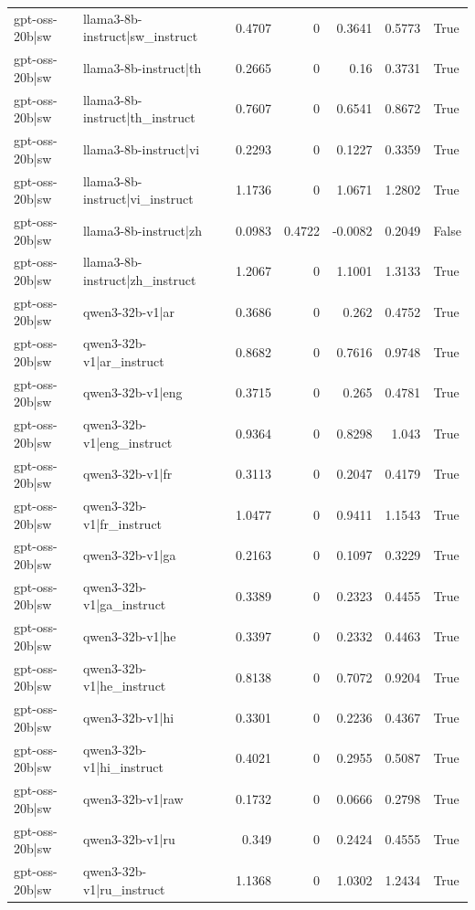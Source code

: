 \begin{table}
\begin{tabular}{l l r r r r l}
gpt-oss-20b|sw & llama3-8b-instruct|sw_instruct & 0.4707 & 0 & 0.3641 & 0.5773 & True \\
gpt-oss-20b|sw & llama3-8b-instruct|th & 0.2665 & 0 & 0.16 & 0.3731 & True \\
gpt-oss-20b|sw & llama3-8b-instruct|th_instruct & 0.7607 & 0 & 0.6541 & 0.8672 & True \\
gpt-oss-20b|sw & llama3-8b-instruct|vi & 0.2293 & 0 & 0.1227 & 0.3359 & True \\
gpt-oss-20b|sw & llama3-8b-instruct|vi_instruct & 1.1736 & 0 & 1.0671 & 1.2802 & True \\
gpt-oss-20b|sw & llama3-8b-instruct|zh & 0.0983 & 0.4722 & -0.0082 & 0.2049 & False \\
gpt-oss-20b|sw & llama3-8b-instruct|zh_instruct & 1.2067 & 0 & 1.1001 & 1.3133 & True \\
gpt-oss-20b|sw & qwen3-32b-v1|ar & 0.3686 & 0 & 0.262 & 0.4752 & True \\
gpt-oss-20b|sw & qwen3-32b-v1|ar_instruct & 0.8682 & 0 & 0.7616 & 0.9748 & True \\
gpt-oss-20b|sw & qwen3-32b-v1|eng & 0.3715 & 0 & 0.265 & 0.4781 & True \\
gpt-oss-20b|sw & qwen3-32b-v1|eng_instruct & 0.9364 & 0 & 0.8298 & 1.043 & True \\
gpt-oss-20b|sw & qwen3-32b-v1|fr & 0.3113 & 0 & 0.2047 & 0.4179 & True \\
gpt-oss-20b|sw & qwen3-32b-v1|fr_instruct & 1.0477 & 0 & 0.9411 & 1.1543 & True \\
gpt-oss-20b|sw & qwen3-32b-v1|ga & 0.2163 & 0 & 0.1097 & 0.3229 & True \\
gpt-oss-20b|sw & qwen3-32b-v1|ga_instruct & 0.3389 & 0 & 0.2323 & 0.4455 & True \\
gpt-oss-20b|sw & qwen3-32b-v1|he & 0.3397 & 0 & 0.2332 & 0.4463 & True \\
gpt-oss-20b|sw & qwen3-32b-v1|he_instruct & 0.8138 & 0 & 0.7072 & 0.9204 & True \\
gpt-oss-20b|sw & qwen3-32b-v1|hi & 0.3301 & 0 & 0.2236 & 0.4367 & True \\
gpt-oss-20b|sw & qwen3-32b-v1|hi_instruct & 0.4021 & 0 & 0.2955 & 0.5087 & True \\
gpt-oss-20b|sw & qwen3-32b-v1|raw & 0.1732 & 0 & 0.0666 & 0.2798 & True \\
gpt-oss-20b|sw & qwen3-32b-v1|ru & 0.349 & 0 & 0.2424 & 0.4555 & True \\
gpt-oss-20b|sw & qwen3-32b-v1|ru_instruct & 1.1368 & 0 & 1.0302 & 1.2434 & True \\

\end{tabular}
\end{table}
